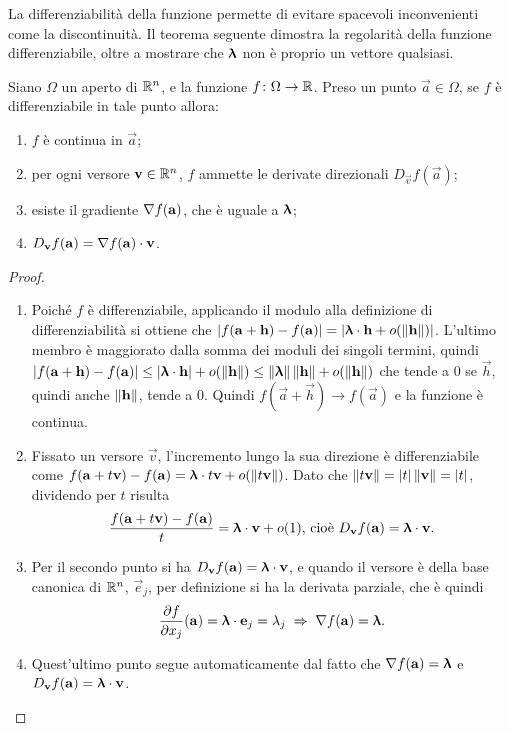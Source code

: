 La differenziabilità della funzione permette di evitare spacevoli inconvenienti come la discontinuità. Il teorema seguente dimostra la regolarità della funzione differenziabile, oltre a mostrare che $\bm{\uplambda}$ non è proprio un vettore qualsiasi.
\begin{teorema} \label{t:conseguenze_differenziabilita}
Siano $\Omega$ un aperto di $\mathbb{R}^n$, e la funzione $f\colon\Omega\to\mathbb{R}$. Preso un punto $\vec a\in\Omega$, se $f$ è differenziabile in tale punto allora:
\begin{enumerate}
\item $f$ è continua in $\vec a$;
\item per ogni versore $\mathbf{v}\in\mathbb{R}^n$, $f$ ammette le derivate direzionali $D_{\vec v}f(\vec a)$;
\item esiste il gradiente $\nabla f(\mathbf{a})$, che è uguale a $\bm{\uplambda}$;
\item $D_{\mathbf{v}}f(\mathbf{a})={\nabla f(\mathbf{a})}\cdot{\mathbf{v}}$.
\end{enumerate}
\end{teorema}
\begin{proof}
\begin{enumerate}
\item Poiché $f$ è differenziabile, applicando il modulo alla definizione di differenziabilità si ottiene che $\left|{f(\mathbf{a}+\mathbf{h})-f(\mathbf{a})}\right|=\left|{{\bm{\uplambda}}\cdot{\mathbf{h}}+o(\left\|{\mathbf{h}}\right\|)}\right|$. L'ultimo membro è maggiorato dalla somma dei moduli dei singoli termini, quindi $\left|{f(\mathbf{a}+\mathbf{h})-f(\mathbf{a})}\right|\leq\left|{{\bm{\uplambda}}\cdot{\mathbf{h}}}\right|+o(\left\|{\mathbf{h}}\right\|)\leq\left\|{\bm{\uplambda}}\right\|\left\|{\mathbf{h}}\right\|+o(\left\|{\mathbf{h}}\right\|)$ che tende a 0 se $\vec h$, quindi anche $\left\|{\mathbf{h}}\right\|$, tende a 0. Quindi $f(\vec a+\vec h)\to f(\vec a)$ e la funzione è continua.
\item Fissato un versore $\vec v$, l'incremento lungo la sua direzione è differenziabile come $f(\mathbf{a}+t\mathbf{v})-f(\mathbf{a})={\bm{\uplambda}}\cdot{t\mathbf{v}}+o(\left\|{t\mathbf{v}}\right\|)$. Dato che $\left\|{t\mathbf{v}}\right\|=\left|{t}\right|\left\|{\mathbf{v}}\right\|=\left|{t}\right|$, dividendo per $t$ risulta
\[
\frac{f(\mathbf{a}+t\mathbf{v})-f(\mathbf{a})}{t}={\bm{\uplambda}}\cdot{\mathbf{v}}+o(1)\text{, cioè }D_{\mathbf{v}}f(\mathbf{a})={\bm{\uplambda}}\cdot{\mathbf{v}}.
\]
\item Per il secondo punto si ha $D_{\mathbf{v}}f(\mathbf{a})={\bm{\uplambda}}\cdot{\mathbf{v}}$, e quando il versore è della base canonica di $\mathbb{R}^n$, $\vec e_j$, per definizione si ha la derivata parziale, che è quindi
\[
\frac{\partial {f}}{\partial {x_j}}(\mathbf{a})={\bm{\uplambda}}\cdot{\mathbf{e}_j}=\lambda_j\;\Rightarrow\;\nabla f(\mathbf{a})=\bm{\uplambda}.
\]
\item Quest'ultimo punto segue automaticamente dal fatto che $\nabla f(\mathbf{a})=\bm{\uplambda}$ e $D_{\mathbf{v}}f(\mathbf{a})={\bm{\uplambda}}\cdot{\mathbf{v}}$.\qedhere
\end{enumerate}
\end{proof}

